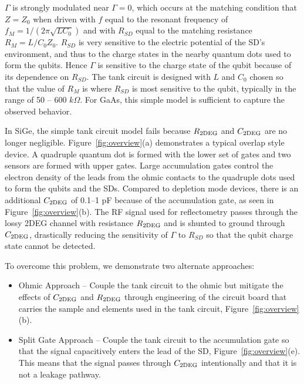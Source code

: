 \documentclass{article}
\begin{document}
$\Gamma$ is strongly modulated near $\Gamma = 0$, which occurs at the matching condition that $Z=Z_0$ when driven with $f$ equal to the resonant frequency of $f_M=1/(2\pi \sqrt{LC_0})$ and with $R_{SD}$ equal to the matching resistance $R_M=L/C_0Z_0$. $R_{SD}$ is very sensitive to the electric potential of the SD's environment, and thus to the charge states in the nearby quantum dots used to form the qubits.  Hence $\Gamma$ is sensitive to the charge state of the qubit because of its dependence on $R_{SD}$.  The tank circuit is designed with $L$ and $C_0$ chosen so that the value of $R_M$ is where $R_{SD}$ is most sensitive to the qubit, typically in the range  of 50 -- 600 $k\Omega$.  For GaAs, this simple model is sufficient to capture the observed behavior. 


In SiGe, the simple tank circuit model fails because $R_{\rm 2DEG}$ and $C_{\rm 2DEG}$ are no longer negligible.	Figure\ \ref{fig:overview}(a) demonstrates a typical overlap style device.  A quadruple quantum dot is formed with the lower set of gates and two sensors are formed with upper gates. Large accumulation gates control the electron density of the leads from the ohmic contacts to the quadruple dots used to form the qubits and the SDs.  Compared to depletion mode devices, there is an additional $C_{\rm 2DEG}$ of 0.1--1 pF because of the accumulation gate, as seen in Figure\ \ref{fig:overview}(b).  The RF signal used for reflectometry passes through the lossy 2DEG channel with resistance $R_{\rm 2DEG}$ and is shunted to ground through $C_{\rm 2DEG}$, drastically reducing the sensitivity of $\Gamma$ to $R_{SD}$ so that the qubit charge state cannot be detected. 


To overcome this problem, we demonstrate two alternate approaches:
\begin{itemize}
	\item Ohmic Approach -- Couple the tank circuit to the ohmic but mitigate the effects of $C_{\rm 2DEG}$ and $R_{\rm 2DEG}$ through engineering of the circuit board that carries the sample and elements used in the tank circuit, Figure\ \ref{fig:overview}(b).
	\item Split Gate Approach -- Couple the tank circuit to the accumulation gate so that the signal capacitively enters the lead of the SD, Figure\ \ref{fig:overview}(e).  This means that the signal passes through $C_{\rm 2DEG}$ intentionally and that it is not a leakage pathway.
\end{itemize}
\end{document}
